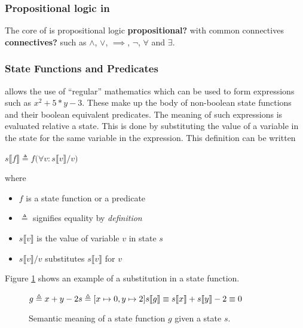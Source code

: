 \documentclass[english, biblatex, digitaloutput]{kththesis}
\begin{document}
\subsubsection{Propositional logic in }

The core of  is propositional logic \textbf{propositional?} with common connectives \textbf{connectives?} such as $\land$, $\lor$, $\implies$, $\lnot$, $\forall$ and $\exists$.

\subsubsection{State Functions and Predicates}

 allows the use of ``regular'' mathematics which can be used to form expressions such as $x^2 + 5*y - 3$. These make up the body of non-boolean state functions and their boolean equivalent predicates. The meaning of such expressions is evaluated relative a state. This is done by substituting the value of a variable in the state for the same variable in the expression. This definition can be written

\begin{math}
	s \llbracket f \rrbracket \triangleq f \lparen \forall v : s \llbracket v \rrbracket / v \rparen
\end{math}

where

\begin{itemize}
	\item $f$ is a state function or a predicate
	\item $\triangleq$ signifies equality by \textit{definition}
	\item $s \llbracket v \rrbracket$ is the value of variable $v$ in state $s$
	\item $s \llbracket v \rrbracket / v$ substitutes  $s \llbracket v \rrbracket$ for $v$
\end{itemize}

Figure \ref{fig:state-function-example} shows an example of a substitution in a state function.

\begin{figure}
	\begin{math}
		g \triangleq x + y - 2 \\
		s \triangleq \lbrack x \mapsto 0, y \mapsto 2 \rbrack \\
		s \llbracket g \rrbracket \equiv s \llbracket x \rrbracket + s \llbracket y \rrbracket - 2 \equiv 0
	\end{math}
	\caption{Semantic meaning of a state function $g$ given a state $s$.}
	\label{fig:state-function-example}
\end{figure}
\end{document}
